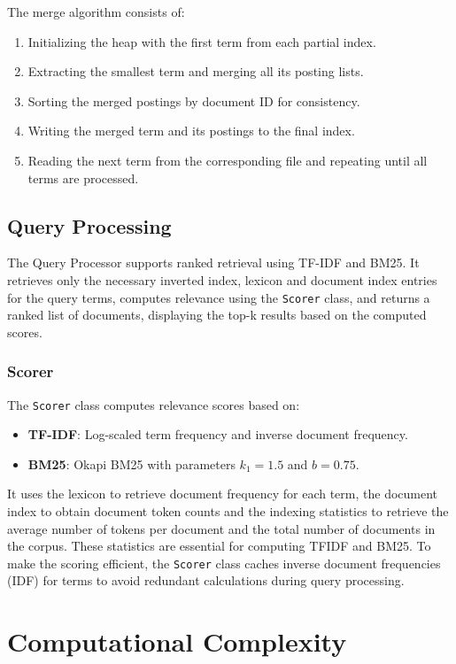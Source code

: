 \documentclass[sigconf]{acmart}
\begin{document}
The merge algorithm consists of:
\begin{enumerate}
    \item Initializing the heap with the first term from each partial index.
    \item Extracting the smallest term and merging all its posting lists.
    \item Sorting the merged postings by document ID for consistency.
    \item Writing the merged term and its postings to the final index.
    \item Reading the next term from the corresponding file and repeating until all terms are processed.
\end{enumerate}

\subsection{Query Processing}
The Query Processor supports ranked retrieval using TF-IDF and BM25. It retrieves only the necessary inverted index, lexicon and document index entries for the query terms, computes relevance using the \texttt{Scorer} class, and returns a ranked list of documents, displaying the top-k results based on the computed scores.

\subsubsection{Scorer}

The \texttt{Scorer} class computes relevance scores based on:
\begin{itemize}
    \item \textbf{TF-IDF}: Log-scaled term frequency and inverse document frequency.
    \item \textbf{BM25}: Okapi BM25 with parameters $k_1 = 1.5$ and $b = 0.75$.
\end{itemize}
It uses the lexicon to retrieve document frequency for each term, the document index to obtain document token counts and the indexing statistics to retrieve the average number of tokens per document and the total number of documents in the corpus. These statistics are essential for computing TFIDF and BM25. To make the scoring efficient, the \texttt{Scorer} class caches inverse document frequencies (IDF) for terms to avoid redundant calculations during query processing.

\section{Computational Complexity}
\end{document}
